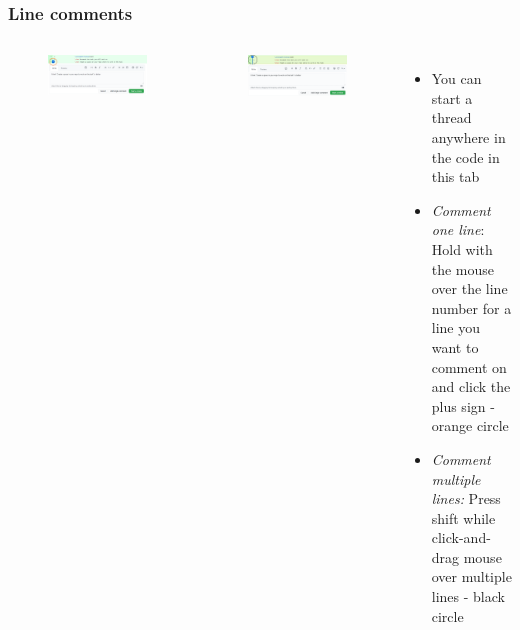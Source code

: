 \documentclass[aspectratio=169]{beamer} %
\begin{document}
\begin{frame}
	\frametitle{Line comments}
	\begin{columns}[c]
		
		\vspace{-.6cm}
		\begin{figure}
			\centering
			\includegraphics[width=\textwidth]{./img/line-comment-1.png}
		\end{figure}
		\vspace{-.3cm}
		\begin{figure}
			\centering
			\includegraphics[width=\textwidth]{./img/line-comment-2.png}
		\end{figure}
		
		\begin{itemize}
			\setlength\itemsep{1em}
			\item You can start a thread anywhere in the code in this tab
			\item \textit{Comment one line}: Hold with the mouse over the line number 
			for a line you want to comment on and click the plus sign - orange circle
			\item \textit{Comment multiple lines:} Press shift while 
			click-and-drag mouse over multiple lines - black circle
		\end{itemize}
		
	\end{columns}
\end{frame}
\end{document}
